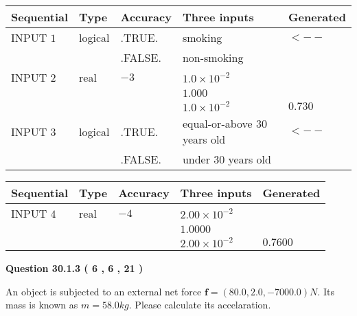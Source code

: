 \documentclass[12pt]{article}
\begin{document}
   
  
  
\noindent\begin{tabular}{|l|l|l|l|l|}
\hline
 Sequential & Type & Accuracy & Three inputs & Generated \\ 
\hline
 
 
  INPUT $            1 $ & logical & .TRUE. & 
 smoking & 
  $ <-- $ 
  \\
  & & .FALSE. & 
  non-smoking & 
 \\  \hline  
 
 
  INPUT $            2 $ & real & $           -3  $ & $
 1.0 \times 10^{-2}
  $ & \\
  & & &  $
 1.000
  $ & \\
  & & &  $
 1.0 \times 10^{-2}
 $ & $ 0.730 $ 
 \\  \hline  
 
 
  INPUT $            3 $ & logical & .TRUE. & 
 equal-or-above 30 years old & 
  $ <-- $ 
  \\
  & & .FALSE. & 
  under 30 years old & 
 \\  \hline  
 \end{tabular}
   
   
  
  
\noindent\begin{tabular}{|l|l|l|l|l|}
\hline
 Sequential & Type & Accuracy & Three inputs & Generated \\ 
\hline
 
 
  INPUT $            4 $ & real & $           -4  $ & $
 2.00 \times 10^{-2}
  $ & \\
  & & &  $
 1.0000
  $ & \\
  & & &  $
 2.00 \times 10^{-2}
 $ & $ 0.7600 $ 
 \\  \hline  
 \end{tabular}
   
   
  
\vspace{0.2in}
  
{\textbf{\Large{Question
30.1.3 
 (           6 ,           6 ,          21 )
}}}
  
  
 
An object is subjected to an external net force $\mathbf{f}=(
80.0,  %
2.0,
-7000.0  )N$. Its mass is known as
$m= %
58.0 kg$. Please calculate its accelaration.
 
 
 
 
\noindent{}
 
 
\end{document}
